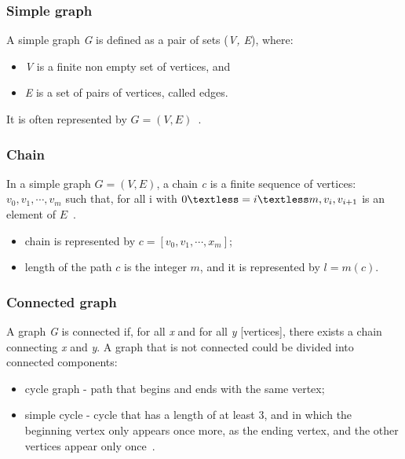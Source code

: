 \subsubsection*{Simple graph}
A simple graph \textit{G} is defined as a pair of sets (\textit{V, E}), where:
\begin{itemize}\addtolength{\itemsep}{-0.5\baselineskip}\vspace{-7mm}
\item \textit{V} is a finite non empty set of vertices, and
\item \textit{E} is a set of pairs of vertices, called edges. 
\end{itemize}\vspace{-5mm}
It is often represented by $G = (V, E)$~\cite{graph}.

\subsubsection*{Chain}
In a simple graph $G = (V, E)$, a chain \textit{c} is a finite sequence of vertices: $v_{0}, v_{1}, \cdots , v_{m}$ such that, for all i with $0 \textless= i \textless m, v_{i}, v_{i + 1}$ is an element of $E$~\cite{alain}.
\begin{itemize}\addtolength{\itemsep}{-0.5\baselineskip}\vspace{-7mm}
\item chain is represented by $c = [v_{0}, v_{1}, \cdots , x_{m}]$;
\item length of the path $c$ is the integer $m$, and it is represented by $l = m(c)$.
\end{itemize}

\subsubsection*{Connected graph}
A graph \textit{G} is connected if, for all \textit{x} and for all \textit{y} [vertices], there exists a chain connecting \textit{x} and \textit{y}.  A graph that is not connected could be divided into connected components:

\begin{itemize}\addtolength{\itemsep}{-0.5\baselineskip}\vspace{-7mm}
\item cycle graph - path that begins and ends with the same vertex;
\item simple cycle - cycle that has a length of at least 3, and in which the beginning vertex only appears once more, as the ending vertex, and the other vertices appear only once~\cite{alain,graph}.
\end{itemize}

